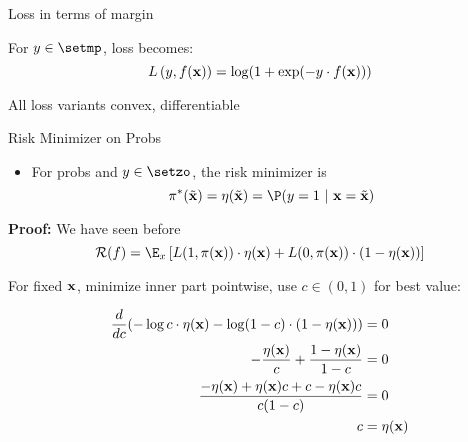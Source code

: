 \documentclass[11pt,compress,t,notes=noshow, xcolor=table]{beamer}
\begin{document}
\begin{framei}[sep=M]{Loss in terms of margin}

\item For $y \in \setmp$, loss becomes: 
$$
  L\left(y, f(\mathbf{x})\right) = \log(1+\exp(-y \cdot f(\mathbf{x}))) 
$$
 
\item All loss variants convex, differentiable

 \vfill



\end{framei}


\begin{frame}{Risk Minimizer on Probs}

\begin{itemize}
    \item For probs and $y \in \setzo$, the risk minimizer is
$$
  \piastxtil = \eta(\xtil) = \P(y = 1 ~|~ \xv = \xtil) 
$$
\end{itemize}


\textbf{Proof:} We have seen before
$$
  \riskf = \E_x \left[L(1, \pix) \cdot \eta(\xv) + L(0, \pix) \cdot (1 - \eta(\xv)) \right]
$$

For fixed $\mathbf{x}$, minimize inner part pointwise, use $c\in(0,1)$ for best value:

{\footnotesize
\begin{align*}
  \frac{d}{d c} (- \log c  \cdot \eta(\mathbf{x})- \log (1 - c) \cdot (1 - \eta(\mathbf{x}))) &= 0 \\
  - \frac{\eta(\mathbf{x})}{c} + \frac{1 - \eta(\mathbf{x})}{1 - c} &= 0 \\
  \frac{- \eta(\mathbf{x}) + \eta(\mathbf{x}) c + c - \eta(\mathbf{x}) c}{c (1 - c)} &= 0 \\
  c &= \eta(\mathbf{x})
\end{align*}
}

\end{frame}
\end{document}
